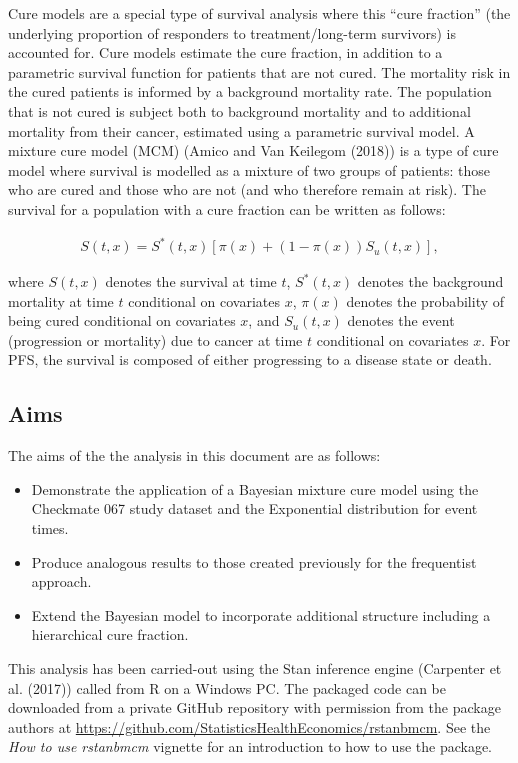 \documentclass[
]{article}
\providecommand{\tightlist}{%
  \setlength{\itemsep}{0pt}\setlength{\parskip}{0pt}}
\begin{document}
Cure models are a special type of survival analysis where this ``cure
fraction'' (the underlying proportion of responders to
treatment/long-term survivors) is accounted for. Cure models estimate
the cure fraction, in addition to a parametric survival function for
patients that are not cured. The mortality risk in the cured patients is
informed by a background mortality rate. The population that is not
cured is subject both to background mortality and to additional
mortality from their cancer, estimated using a parametric survival
model. A mixture cure model (MCM) (Amico and Van Keilegom (2018)) is a
type of cure model where survival is modelled as a mixture of two groups
of patients: those who are cured and those who are not (and who
therefore remain at risk). The survival for a population with a cure
fraction can be written as follows:

\begin{align}
\tag{*}
S(t, x) = S^*(t, x)[\pi(x) + (1 − \pi(x))S_u(t, x)],
\end{align}

where \(S(t, x)\) denotes the survival at time \(t\), \(S^*(t, x)\)
denotes the background mortality at time \(t\) conditional on covariates
\(x\), \(\pi(x)\) denotes the probability of being cured conditional on
covariates \(x\), and \(S_u(t, x)\) denotes the event (progression or
mortality) due to cancer at time \(t\) conditional on covariates \(x\).
For PFS, the survival is composed of either progressing to a disease
state or death.

\hypertarget{aims}{%
\subsection{Aims}\label{aims}}

The aims of the the analysis in this document are as follows:

\begin{itemize}
\tightlist
\item
  Demonstrate the application of a Bayesian mixture cure model using the
  Checkmate 067 study dataset and the Exponential distribution for event
  times.
\item
  Produce analogous results to those created previously for the
  frequentist approach.
\item
  Extend the Bayesian model to incorporate additional structure
  including a hierarchical cure fraction.
\end{itemize}

This analysis has been carried-out using the Stan inference engine
(Carpenter et al. (2017)) called from R on a Windows PC. The packaged
code can be downloaded from a private GitHub repository with permission
from the package authors at
\url{https://github.com/StatisticsHealthEconomics/rstanbmcm}. See the
\emph{How to use rstanbmcm} vignette for an introduction to how to use
the package.
\end{document}
